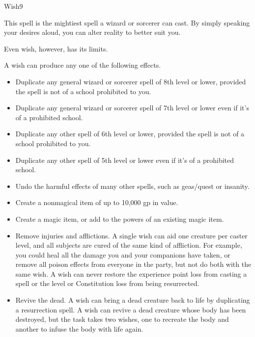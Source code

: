 \begin{spellfooter}
\begin{spellsection}{Wish}{9}
    \begin{spellheader}
    \end{spellheader}
    \begin{spellcontent}
        \begin{spelltargetinginfo}
        \end{spelltargetinginfo}
        \spelleffect This spell is the mightiest spell a wizard or sorcerer can cast. By simply speaking your desires aloud, you can alter reality to better suit you.
        \par Even wish, however, has its limits.
        \par A wish can produce any one of the following effects.
        \begin{itemize}
            \item Duplicate any general wizard or sorcerer spell of 8th level or lower, provided the spell is not of a school prohibited to you.
            \item Duplicate any general wizard or sorcerer spell of 7th level or lower even if it's of a prohibited school.
            \item Duplicate any other spell of 6th level or lower, provided the spell is not of a school prohibited to you.
            \item Duplicate any other spell of 5th level or lower even if it's of a prohibited school.
            \item Undo the harmful effects of many other spells, such as geas/quest or insanity.
            \item Create a nonmagical item of up to 10,000 gp in value.
            \item Create a magic item, or add to the powers of an existing magic item.
            \item Remove injuries and afflictions. A single wish can aid one creature per caster level, and all subjects are cured of the same kind of affliction. For example, you could heal all the damage you and your companions have taken, or remove all poison effects from everyone in the party, but not do both with the same wish. A wish can never restore the experience point loss from casting a spell or the level or Constitution loss from being resurrected.
            \item Revive the dead. A wish can bring a dead creature back to life by duplicating a resurrection spell. A wish can revive a dead creature whose body has been destroyed, but the task takes two wishes, one to recreate the body and another to infuse the body with life again.

\end{itemize}
\end{spellcontent}
\end{spellsection}
\end{spellfooter}
